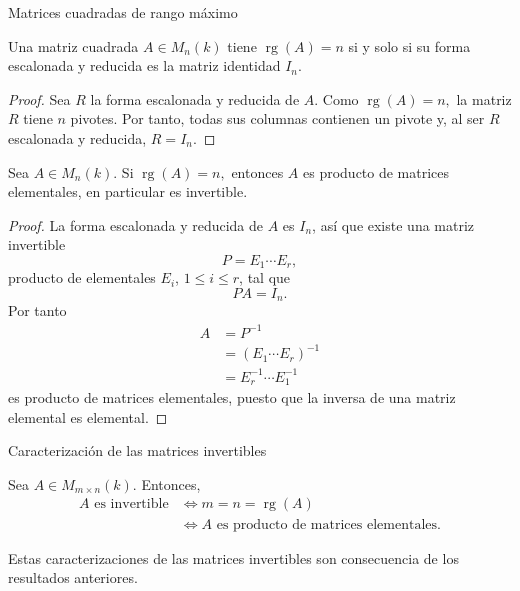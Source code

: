 \begin{frame}[allowframebreaks, t]{Matrices cuadradas de rango máximo}

\begin{lemma}
	Una matriz cuadrada \(A\in M_n(k)\) tiene
	\(
	\operatorname{rg}(A)=n
	\)
	si y solo si su forma escalonada y reducida es la matriz identidad $I_n$.
\end{lemma}

\begin{proof}
Sea $R$ la forma escalonada y reducida de $A$.
Como
\(
\operatorname{rg}(A)=n,
\)
la matriz \(R\) tiene \(n\) pivotes. Por tanto, todas sus columnas
contienen un pivote y, al ser \(R\) escalonada y reducida,
\(
R=I_n.
\)
\end{proof}


\begin{corollary}
Sea \(A\in M_n(k)\). Si
\(
\operatorname{rg}(A)=n,
\)
entonces \(A\) es producto de matrices elementales, en particular es  invertible.
\end{corollary}

\begin{proof}
La forma escalonada y reducida de $A$ es $I_n$, así que existe una matriz invertible $$P=E_1\cdots E_r,$$ producto de elementales $E_i$, $1\leq i\leq r$, tal que $$PA=I_n.$$ Por tanto 
\begin{align*}
A&=P^{-1}\\
&=(E_1\cdots E_r)^{-1}\\
&=E_r^{-1}\cdots E_1^{-1}
\end{align*}
es producto de matrices elementales, puesto que la inversa de una matriz elemental es elemental.
\end{proof}

\end{frame}

\begin{frame}{Caracterización de las matrices invertibles}

\begin{theorem}
Sea \(A\in M_{m\times n}(k)\). Entonces,
\begin{align*}
A\text{ es invertible}
&\Longleftrightarrow
m=n=\operatorname{rg}(A)\\
&\Longleftrightarrow
A\text{ es producto de matrices elementales}.
\end{align*}
\end{theorem}

Estas caracterizaciones de las matrices invertibles son consecuencia de los resultados anteriores.

\end{frame}

